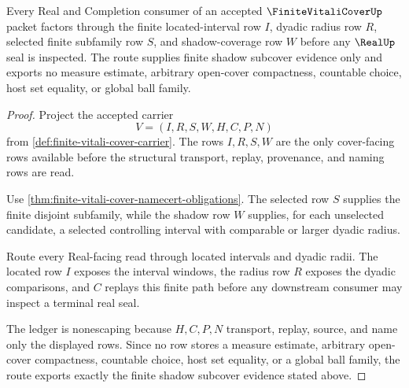 \begin{theorem}\label{thm:finite-vitali-cover-real-completion-subcover-route}
Every Real and Completion consumer of an accepted $\FiniteVitaliCoverUp$ packet factors through the finite located-interval row $I$, dyadic radius row $R$, selected finite subfamily row $S$, and shadow-coverage row $W$ before any $\RealUp$ seal is inspected. The route supplies finite shadow subcover evidence only and exports no measure estimate, arbitrary open-cover compactness, countable choice, host set equality, or global ball family.
\end{theorem}
\begin{proof}
Project the accepted carrier
$$
V=(I,R,S,W,H,C,P,N)
$$
from \autoref{def:finite-vitali-cover-carrier}. The rows $I,R,S,W$ are the only cover-facing rows available before the structural transport, replay, provenance, and naming rows are read.

Use \autoref{thm:finite-vitali-cover-namecert-obligations}. The selected row $S$ supplies the finite disjoint subfamily, while the shadow row $W$ supplies, for each unselected candidate, a selected controlling interval with comparable or larger dyadic radius.

Route every Real-facing read through located intervals and dyadic radii. The located row $I$ exposes the interval windows, the radius row $R$ exposes the dyadic comparisons, and $C$ replays this finite path before any downstream consumer may inspect a terminal real seal.

The ledger is nonescaping because $H,C,P,N$ transport, replay, source, and name only the displayed rows. Since no row stores a measure estimate, arbitrary open-cover compactness, countable choice, host set equality, or a global ball family, the route exports exactly the finite shadow subcover evidence stated above.
\end{proof}


\begin{closurestatus}{\FiniteVitaliCoverUp}
  \theoryclosure{\seedClosure}
  \formalstatus{\unformalizedV}
\end{closurestatus}
